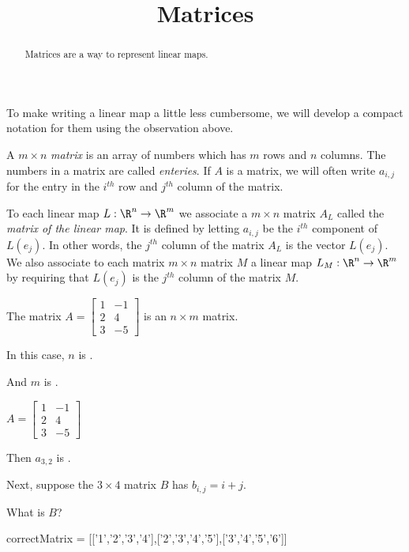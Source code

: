 \documentclass{ximera}
\title{Matrices}
\begin{document}
\begin{abstract}
  Matrices are a way to represent linear maps.
\end{abstract}

To make writing a linear map a little less cumbersome, we will develop a compact notation for them using the observation above. 
	
\begin{definition}
  A $m \times n$ \textit{matrix} is an array of numbers which has $m$ rows and $n$ columns.  The numbers in a matrix are called \textit{enteries}. If $A$ is a matrix, 
  we will often write $a_{i,j}$ for the entry in the $i^{th}$  row and $j^{th}$ column of the matrix.
\end{definition}

\begin{definition}
  To each linear map $L: \R^n \to \R^m$  we associate a $m \times n$ matrix $A_L$ called the \textit{matrix of the linear map}.  It is defined 
  by letting $a_{i,j}$ be the $i^{th}$ component of $L(e_j)$.  In other words, the $j^{th}$ column of the matrix $A_L$ is the vector $L(e_j)$.  We also associate to each 
  matrix $m \times n$ matrix $M$ a linear map $L_M: \R^n \to \R^m$ by requiring that $L(e_j)$ is the $j^{th}$ column of the matrix $M$. 
\end{definition}

\begin{question}
  The matrix $A = \begin{bmatrix}
    1&-1\\2&4\\3&-5
  \end{bmatrix}$
  is an $n \times m$ matrix.  

  \begin{solution}
    In this case, $n$ is .
  \end{solution}

  \begin{solution}
    And $m$ is .
  \end{solution}
\end{question}

\begin{question}
  $A = \begin{bmatrix}
    1&-1\\2&4\\3&-5
  \end{bmatrix}$

  \begin{solution}
    Then $a_{3,2}$ is .
  \end{solution}

  Next, suppose the $3 \times 4$ matrix $B$ has $b_{i,j} = i+j$.

  \begin{solution}
    What is $B$?

    \begin{matrix-answer}[name=B]
      correctMatrix = [['1','2','3','4'],['2','3','4','5'],['3','4','5','6']]
    \end{matrix-answer}
  \end{solution}
\end{question}
\end{document}
